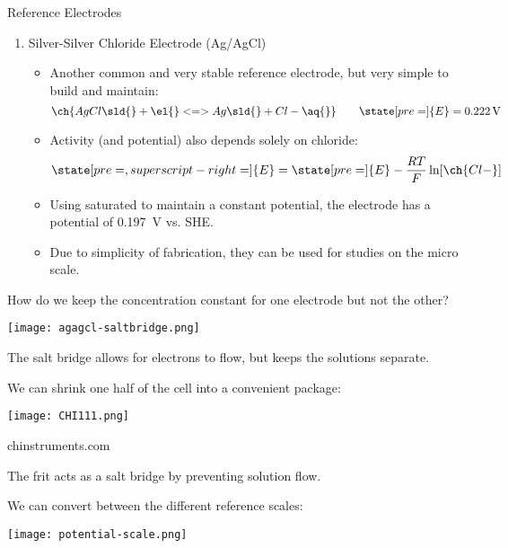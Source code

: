 \documentclass[notes=show]{beamer}
\begin{document}
\begin{frame}[allowframebreaks]{Reference Electrodes}
\begin{enumerate}
			\framebreak

		\item Silver-Silver Chloride Electrode (Ag/AgCl)

			\begin{itemize}
				\item Another common and very stable reference
					electrode, but very simple to build and
					maintain:
					\begin{equation*}
						\ch{AgCl\sld{} + \el{} <=>
						Ag\sld{} + Cl- \aq{}} \qquad
						\state[pre=]{E} =
						\SI{0.222}{\volt}
					\end{equation*}
				\item Activity (and potential) also depends
					solely on chloride:
					\begin{equation*}
						\state[pre=,superscript-right=]{E}
						= \state[pre=]{E} -
						\frac{RT}{F} \ln [\ch{Cl-}]
					\end{equation*}
				\item Using saturated  to maintain a
					constant potential, the electrode has a
					potential of \SI{0.197}{\volt} vs. SHE.
				\item Due to simplicity of fabrication, they can
					be used for studies on the micro scale.
			\end{itemize}
	\end{enumerate}

	\framebreak

	How do we keep the concentration constant for one electrode but not the
	other?

	\begin{center}
		\texttt{[image: agagcl-saltbridge.png]}
	\end{center}

	The \alert{salt bridge} allows for electrons to flow, but keeps the
	solutions separate.

	\framebreak

	We can shrink \alert{one half} of the cell into a convenient package:

	\begin{center}
		\texttt{[image: CHI111.png]}

		\footnotesize chinstruments.com
	\end{center}

	The frit acts as a salt bridge by preventing solution flow.

	\framebreak

	We can convert between the different reference scales:

	\begin{center}
		\texttt{[image: potential-scale.png]}
	\end{center}
\end{frame}
\end{document}
